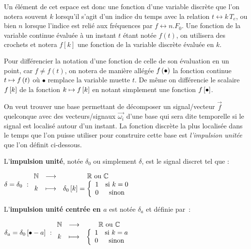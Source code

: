 \begin{remarque}
  Un élément de cet espace est donc une fonction d'une variable
  discrète que l'on notera souvent $k$ lorsqu'il s'agit d'un indice du
  temps avec la relation $t \leftrightarrow k\,T_e$, ou bien $n$
  lorsque l'indice est relié aux fréquences par
  $f \leftrightarrow n.F_0$. Une fonction de la variable continue
  évaluée à un instant $t$ étant notée $f(t)$, on utilisera des
  crochets et notera $f[k]$ une fonction de la variable discrète
  évaluée en $k$.

  Pour différencier la notation d'une fonction de celle de son
  évaluation en un point, car $f\neq f(t)$, on notera de manière
  allégée $f\left(\bullet\right)$ la fonction continue $t\mapsto f\left(t\right)$ où
  $\bullet$ remplace la variable muette $t$. De même on différencie le
  scalaire $f\left[k\right]$ de la fonction $k\mapsto f\left[k\right]$ en notant
  simplement une fonction $f\left[\bullet\right]$.
\end{remarque}
On veut trouver une base permettant de décomposer un signal/vecteur
$\vec{f}$ quelconque avec des vecteurs/signaux $\vec{\omega_i}$ d'une
base qui sera dite temporelle si le signal est localisé autour d'un
instant. La fonction discrète la plus localisée dans le temps que l'on
puisse utiliser pour construire cette base est \emph{l'impulsion
  unitée} que l'on définit ci-dessous.
\begin{definition}
  \label{def:impulsion_unite}
  L'\textbf{impulsion unité}, notée $\delta_0$ ou simplement $\delta$,
  est le signal discret tel que :


  \begin{minipage}[l]{0.5\linewidth}
    $ \delta=\delta_0~:\begin{array}{ccc} \mathbb{N} & \longrightarrow & \mathbb{R} \text{ ou } \mathbb{C} \\ 
      k & \longmapsto & \delta_0\left[k\right]=\left\{\begin{array}{cc} {1} & {\text{si }
        k=0}\\ {0} & {\text{sinon}}\\ \end{array}\right. \\ \end{array} $
  \end{minipage}
  \begin{minipage}[l]{0.5\linewidth}
  \end{minipage}


  L'\textbf{impulsion unité centrée en $a$} est notée $\delta_a$ et
  définie par~:


\begin{minipage}[l]{0.5\linewidth}
  $\delta_a = \delta_0\left[\bullet-a\right]~: \begin{array}{ccc} \mathbb{N} & \longrightarrow & \mathbb{R} \text{ ou }
    \mathbb{C} \\ k & \longmapsto & \left\{\begin{array}{cc} {1} & {\text{si } k=a}\\ {0} & {\text{sinon}}\\ \end{array}\right. \\ \end{array}$
\end{minipage}
\begin{minipage}[l]{0.5\linewidth}
\end{minipage}
\end{definition}

